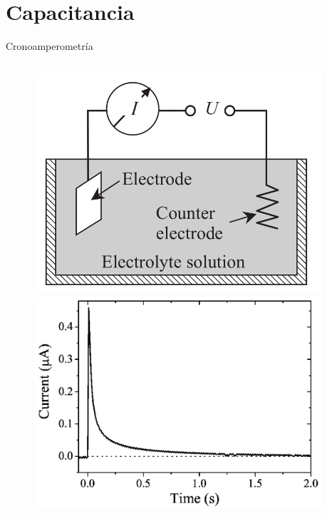\documentclass[handout]{beamer}
\begin{document}
\section{Capacitancia}
\begin{frame}{Cronoamperometr\'ia}
	\begin{columns}
		\begin{column}{0.4\textwidth}
			\begin{figure}[h]
				\centering
				\includegraphics[width=\linewidth]{sources/capacitance}
				\includegraphics[width=\linewidth]{sources/crono}
			\end{figure}
		\end{column}
		\begin{column}{0.6\textwidth}

\end{column}
\end{columns}
\end{frame}
\end{document}
